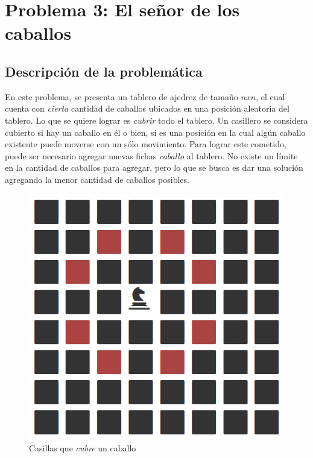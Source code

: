 \section{Problema 3: El se\~nor de los caballos}
\subsection{Descripci\'on de la problem\'atica}

En este problema, se presenta un tablero de ajedrez de tama\~no $nxn$, el cual cuenta con \emph{cierta} cantidad de caballos ubicados en una posici\'on aleatoria del tablero. Lo que se quiere lograr es \emph{cubrir} todo el tablero. Un casillero se considera cubierto si hay un caballo en \'el o bien, si es una posici\'on en la cual alg\'un caballo existente puede moverse con un s\'olo movimiento. Para lograr este cometido, puede ser necesario agregar nuevas fichas \emph{caballo} al tablero. No existe un l\'imite en la cantidad de caballos para agregar, pero lo que se busca es dar una soluci\'on agregando la menor cantidad de caballos posibles.\\

 \begin{figure}[h!]
   \begin{center}
 	\includegraphics[scale=0.4]{imagenes/ej3/unCaballo.png}
 	\caption{Casillas que \emph{cubre} un caballo}
   \end{center}
 \end{figure}


